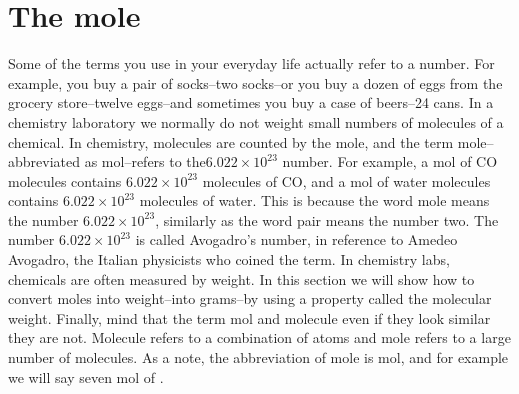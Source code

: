 \documentclass[main.tex]{subfiles}
\begin{document}
\section{The mole}
Some of the terms you use in your everyday life actually refer to a number. For example, you buy a pair of socks--two socks--or you buy a dozen of eggs from the grocery store--twelve eggs--and sometimes you buy a case of beers--24 cans. 
In a chemistry laboratory we normally do not weight small numbers of molecules of a chemical. In chemistry, molecules are counted by the mole, and the term mole--abbreviated as mol--refers to the$6.022\times 10^{23}$ number. For example, a mol of CO molecules contains $6.022\times 10^{23}$ molecules of CO, and a mol of water molecules contains $6.022\times 10^{23}$ molecules of water. This is because the word mole means the number $6.022\times 10^{23}$, similarly as  the word pair means the number two. The number $6.022\times 10^{23}$ is called Avogadro's number, in reference to Amedeo Avogadro, the Italian physicists who coined the term. 
In chemistry labs, chemicals are often measured by weight. In this section we will show how to convert moles into weight--into grams--by using a property called the molecular weight. Finally, mind that the term mol and molecule even if they look similar they are not. Molecule refers to a combination of atoms and mole refers to a large number of molecules. As a note, the abbreviation of mole is mol, and for example we will say seven mol of .
\sloppy 
\end{document}
